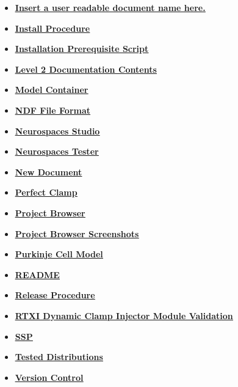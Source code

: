 \documentclass[12pt]{article}
\begin{document}
\begin{itemize}
\item \href{../release-expand/release-expand.pdf}{\bf \underline{Insert a user readable document name here.}}

\item \href{../install-procedure/install-procedure.pdf}{\bf \underline{Install Procedure}}

\item \href{../prerequisite-script/prerequisite-script.pdf}{\bf \underline{Installation Prerequisite Script}}

\item \href{../contents-level2/contents-level2.pdf}{\bf \underline{Level 2 Documentation Contents}}

\item \href{../model-container/model-container.pdf}{\bf \underline{Model Container}}

\item \href{../ndf-file-format/ndf-file-format.pdf}{\bf \underline{NDF File Format}}

\item \href{../studio/studio.pdf}{\bf \underline{Neurospaces Studio}}

\item \href{../neurospaces-tester/neurospaces-tester.pdf}{\bf \underline{Neurospaces Tester}}

\item \href{../NewDocument/NewDocument.pdf}{\bf \underline{New Document}}

\item \href{../pclamp/pclamp.pdf}{\bf \underline{Perfect Clamp}}

\item \href{../project-browser/project-browser.pdf}{\bf \underline{Project Browser}}

\item \href{../project-browser-screenshots/project-browser-screenshots.pdf}{\bf \underline{Project Browser Screenshots}}

\item \href{../purkinje-cell-model/purkinje-cell-model.pdf}{\bf \underline{Purkinje Cell Model}}

\item \href{../README/README.pdf}{\bf \underline{README}}

\item \href{../release-procedure/release-procedure.pdf}{\bf \underline{Release Procedure}}

\item \href{../rtxi-injector-validation/rtxi-injector-validation.pdf}{\bf \underline{RTXI Dynamic Clamp Injector Module Validation}}

\item \href{../ssp/ssp.pdf}{\bf \underline{SSP}}

\item \href{../tested-distributions/tested-distributions.pdf}{\bf \underline{Tested Distributions}}

\item \href{../version-control/version-control.pdf}{\bf \underline{Version Control}}


\end{itemize}

\end{document}
